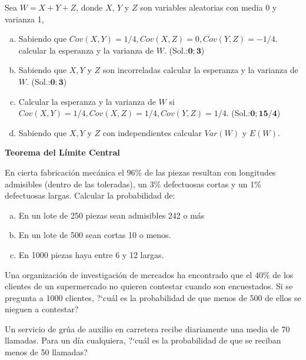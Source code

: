 \documentclass[12pt]{article}
\begin{document}
\begin{prob}  Sea $W = X + Y + Z$, donde  $X$, $Y$ y $Z$ son variables aleatorias con media
0 y varianza 1,
\begin{enumerate}[a)]
\item Sabiendo que  $ Cov(X,Y) = 1/4, Cov(X,Z) = 0, Cov(Y,Z) = -1/4.$
calcular la esperanza y la varianza de $W$. (Sol.:$\mathbf{0; 3}$)
\item Sabiendo  que $X, Y$ y $Z$ 
son incorreladas calcular la esperanza y la varianza de $W$. (Sol.:$\mathbf{0; 3}$)
\item Calcular la esperanza y la varianza de $W$ si  $ Cov(X,Y) = 1/4, Cov(X,Z) = 1/4,
 Cov(Y,Z) = 1/4.$ (Sol.:$\mathbf{0; 15/4 }$)
\item Sabiendo  que $X, Y$ y $Z$ con independientes calcular $Var(W)$ y $E(W)$.
\end{enumerate}
\end{prob}

\begin{centerline}
{{\bf Teorema del Límite Central}}
\end{centerline}


\begin{prob}%
En cierta fabricación mecánica el 96\% de las piezas resultan con longitudes admisibles
(dentro de las toleradas), un 3\% defectuosas cortas y un 1\% defectuosas largas. Calcular
la probabilidad de:

\begin{enumerate}[a)]
\item En un lote de 250 piezas sean admisibles 242 o más
\item En un lote de 500 sean cortas 10 o menos.
\item En 1000 piezas haya entre 6 y 12 largas.
\end{enumerate}
\end{prob}

\begin{prob} Una organización de investigación de mercados ha
encontrado que el 40\% de los clientes de un supermercado no quieren contestar cuando son
encuestados. Si se pregunta a 1000 clientes, ?`cuál es la probabilidad de que menos de 500
de ellos se nieguen a contestar? 

\end{prob}

\begin{prob}
Un servicio de grúa de auxilio en carretera recibe diariamente una media de 70 llamadas.
Para un día cualquiera, ?`cuál es la probabilidad de que se reciban menos de 50 llamadas?
\end{prob}
\end{document}
